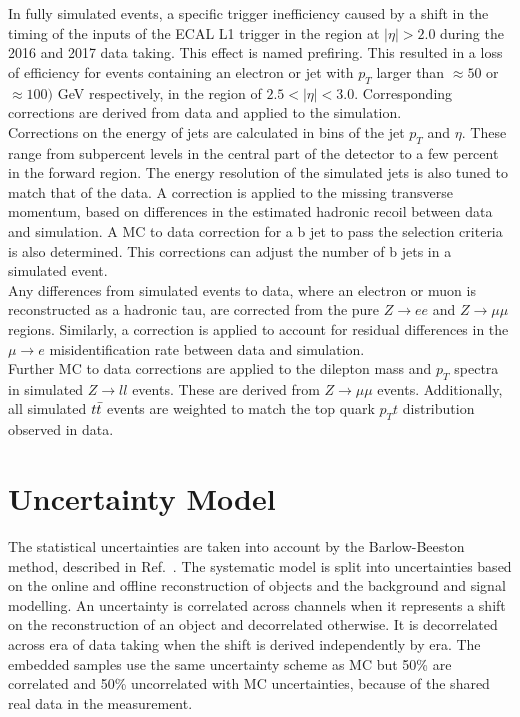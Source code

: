 In fully simulated events, a specific trigger inefficiency caused by a shift in the timing of the inputs of the ECAL L1 trigger in the region at $|\eta|>2.0$ during the 2016 and 2017 data taking.
This effect is named prefiring.
This resulted in a loss of efficiency for events containing an electron or jet with $p_T$ larger than ${\approx}50$ or ${\approx}100)$ GeV respectively, in the region of $2.5<|\eta|<3.0$. 
Corresponding corrections are derived from data and applied to the simulation. \\

Corrections on the energy of jets are calculated in bins of the jet $p_T$ and $\eta$.
These range from subpercent levels in the central part of the detector to a few percent in the forward region. 
The energy resolution of the simulated jets is also tuned to match that of the data. 
A correction is applied to the missing transverse momentum, based on differences in the estimated hadronic recoil between data and simulation. 
A MC to data correction for a b jet to pass the selection criteria is also determined. 
This corrections can adjust the number of b jets in a simulated event. \\

Any differences from simulated events to data, where an electron or muon is reconstructed as a hadronic tau, are corrected from the pure $Z\rightarrow ee$ and $Z\rightarrow\mu\mu$ regions. 
Similarly, a correction is applied to account for residual differences in the $\mu\rightarrow e$ misidentification rate between data and simulation. \\

Further MC to data corrections are applied to the dilepton mass and $p_{T}$ spectra in simulated $Z\rightarrow ll$ events. 
These are derived from $Z\rightarrow\mu\mu$ events.
Additionally, all simulated $t\bar{t}$ events are weighted to match the top quark $p_{T}t$ distribution observed in data.

\section{Uncertainty Model}
\label{sec:uncerts}

The statistical uncertainties are taken into account by the Barlow-Beeston method, described in Ref.~\cite{Barlow:1993dm,Conway:2011in}.
The systematic model is split into uncertainties based on the online and offline reconstruction of objects and the background and signal modelling.
An uncertainty is correlated across channels when it represents a shift on the reconstruction of an object and decorrelated otherwise.
It is decorrelated across era of data taking when the shift is derived independently by era.
The embedded samples use the same uncertainty scheme as MC but 50\% are correlated and 50\% uncorrelated with MC uncertainties, because of the shared real data in the measurement.

